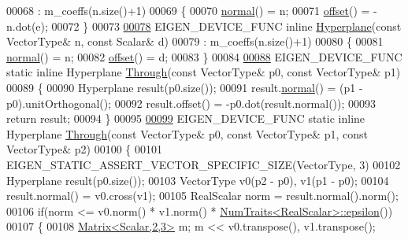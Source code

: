 \begin{DoxyCode}
00068     : m\_coeffs(n.size()+1)
00069   \{
00070     \hyperlink{group___geometry___module_ad3da930fc7025604f2f174651089b2a8}{normal}() = n;
00071     \hyperlink{group___geometry___module_afe2eadf3679e4a802c0e02c15049aed9}{offset}() = -n.dot(e);
00072   \}
00073 
\hyperlink{group___geometry___module_a1375e9d62e54a5ada49b6367ee2eaa8d}{00078}   EIGEN\_DEVICE\_FUNC \textcolor{keyword}{inline} \hyperlink{group___geometry___module_a1375e9d62e54a5ada49b6367ee2eaa8d}{Hyperplane}(\textcolor{keyword}{const} VectorType& n, \textcolor{keyword}{const} Scalar& d)
00079     : m\_coeffs(n.size()+1)
00080   \{
00081     \hyperlink{group___geometry___module_ad3da930fc7025604f2f174651089b2a8}{normal}() = n;
00082     \hyperlink{group___geometry___module_afe2eadf3679e4a802c0e02c15049aed9}{offset}() = d;
00083   \}
00084 
\hyperlink{group___geometry___module_ae0e7dc262623fc937b1b051595b8d3f1}{00088}   EIGEN\_DEVICE\_FUNC \textcolor{keyword}{static} \textcolor{keyword}{inline} Hyperplane \hyperlink{group___geometry___module_ae0e7dc262623fc937b1b051595b8d3f1}{Through}(\textcolor{keyword}{const} VectorType& p0, \textcolor{keyword}{const} VectorType& p1)
00089   \{
00090     Hyperplane result(p0.size());
00091     result.\hyperlink{group___geometry___module_ad3da930fc7025604f2f174651089b2a8}{normal}() = (p1 - p0).unitOrthogonal();
00092     result.offset() = -p0.dot(result.normal());
00093     \textcolor{keywordflow}{return} result;
00094   \}
00095 
\hyperlink{group___geometry___module_ae105a4f5f2252069b1b1251207dca4e0}{00099}   EIGEN\_DEVICE\_FUNC \textcolor{keyword}{static} \textcolor{keyword}{inline} Hyperplane \hyperlink{group___geometry___module_ae105a4f5f2252069b1b1251207dca4e0}{Through}(\textcolor{keyword}{const} VectorType& p0, \textcolor{keyword}{const} VectorType& p1, \textcolor{keyword}{
      const} VectorType& p2)
00100   \{
00101     EIGEN\_STATIC\_ASSERT\_VECTOR\_SPECIFIC\_SIZE(VectorType, 3)
00102     Hyperplane result(p0.size());
00103     VectorType v0(p2 - p0), v1(p1 - p0);
00104     result.normal() = v0.cross(v1);
00105     RealScalar norm = result.normal().norm();
00106     \textcolor{keywordflow}{if}(norm <= v0.norm() * v1.norm() * \hyperlink{group___core___module_struct_eigen_1_1_num_traits}{NumTraits<RealScalar>::epsilon}())
00107     \{
00108       \hyperlink{group___core___module_class_eigen_1_1_matrix}{Matrix<Scalar,2,3>} m; m << v0.transpose(), v1.transpose();

\end{DoxyCode}
